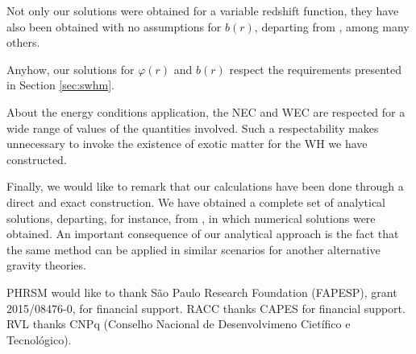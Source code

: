 \documentclass[aps,preprint,onecolumn,11pt,showkeys]{revtex4}%
\begin{document}
Not only our solutions were obtained for a variable redshift function, they
have also been obtained with no assumptions for $b(r)$, departing from
\cite{myrzakulov/2016,zubair/2016b,jamil/2013,yue/2011,rahaman/2006}, among
many others.

Anyhow, our solutions for $\varphi(r)$ and $b(r)$ respect the requirements presented in Section \ref{sec:swhm}.

About the energy conditions application, the NEC and WEC are respected for a wide range of values of the quantities involved.  Such a respectability makes unnecessary to invoke the existence of exotic matter for the WH we have constructed.

Finally, we would like to remark that our calculations have been done
through a direct and exact construction. We have obtained a complete set of
analytical solutions, departing, for instance, from \cite{zubair/2016b}, in which numerical solutions were obtained. An important consequence of our analytical approach is the fact that the same method can be applied in similar scenarios for another alternative gravity theories.





\bigskip

\begin{acknowledgments}
PHRSM would like to thank S\~ao Paulo Research Foundation (FAPESP), grant
2015/08476-0, for financial support. RACC thanks CAPES for financial support. RVL thanks CNPq (Conselho Nacional de Desenvolvimeno Ciet\'ifico e Tecnol\'ogico).
\end{acknowledgments}
\end{document}
